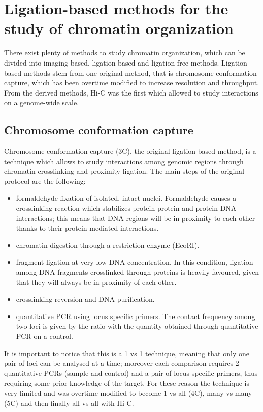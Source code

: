 \section{Ligation-based methods for the study of chromatin organization}

There exist plenty of methods to study chromatin organization, which can be divided into imaging-based, ligation-based and ligation-free methods. Ligation-based methods stem from one original method, that is chromosome conformation capture, which has been overtime modified to increase resolution and throughput. From the derived methods, Hi-C was the first which allowed to study interactions on a genome-wide scale.

\subsection{Chromosome conformation capture}
Chromosome conformation capture (3C), the original ligation-based method, is a technique which allows to study interactions among genomic regions through chromatin crosslinking and proximity ligation\cite{3coriginal2002}. The main steps of the original protocol are the following:
\begin{itemize}\tightlist
  \item formaldehyde fixation of isolated, intact nuclei. Formaldehyde causes a crosslinking reaction which stabilizes protein-protein and protein-DNA interactions; this means that DNA regions will be in proximity to each other thanks to their protein mediated interactions. 
  \item chromatin digestion through a restriction enzyme (EcoRI).
  \item fragment ligation at very low DNA concentration. In this condition, ligation among DNA fragments crosslinked through proteins is heavily favoured, given that they will always be in proximity of each other.
  \item crosslinking reversion and DNA purification.
  \item quantitative PCR using locus specific primers. The contact frequency among two loci is given by the ratio with the quantity obtained through quantitative PCR on a control.
\end{itemize}
It is important to notice that this is a 1 vs 1 technique, meaning that only one pair of loci can be analysed at a time; moreover each comparison requires 2 quantitative PCRs (sample and control) and a pair of locus specific primers, thus requiring some prior knowledge of the target. For these reason the technique is very limited and was overtime modified to become 1 vs all (4C\cite{4cprotocol2006}), many vs many (5C\cite{5cprotocol2006}) and then finally all vs all with Hi-C.


